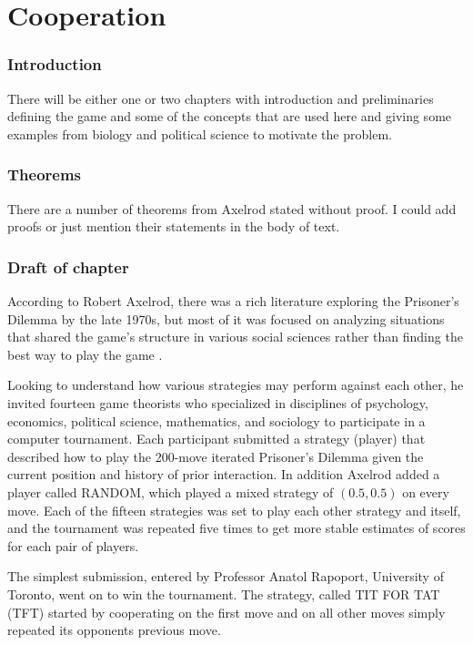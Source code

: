 

\chapter{Cooperation}

\subsection{Introduction}
There will be either one or two chapters with introduction and preliminaries defining the game and some of the concepts that are used here and giving some examples from biology and political science to motivate the problem.

\subsection{Theorems}
There are a number of theorems from Axelrod stated without proof. I could add proofs or just mention their statements in the body of text.

\subsection{Draft of chapter}

According to Robert Axelrod, there was a rich literature exploring the Prisoner's Dilemma by the late 1970s, but most of it was focused on analyzing situations that shared the game's structure in various social sciences rather than finding the best way to play the game \cite[p.28]{axelrod1984evolution}. 

Looking to understand how various strategies may perform against each other, he invited fourteen game theorists who specialized in disciplines of psychology, economics, political science, mathematics, and sociology to participate in a computer tournament. Each participant submitted a strategy (player) that described how to play the 200-move iterated Prisoner's Dilemma given the current position and history of prior interaction. In addition Axelrod added a player called RANDOM, which played a mixed strategy of $(0.5, 0.5)$  on every move. Each of the fifteen strategies was set to play each other strategy and itself, and the tournament was repeated five times to get more stable estimates of scores for each pair of players.

The simplest submission, entered by Professor Anatol Rapoport, University of Toronto, went on to win the tournament. The strategy, called TIT FOR TAT (TFT) started by cooperating on the first move and on all other moves simply repeated its opponents previous move.

